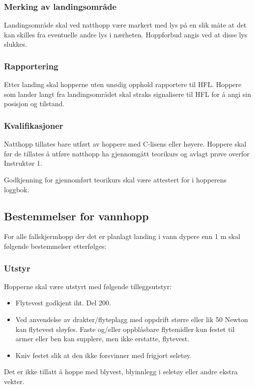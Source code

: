 \subsubsection{Merking av landingsområde}
Landingsområde skal ved natthopp være markert med lys på en slik måte at det kan skilles fra eventuelle andre lys i nærheten. Hoppforbud angis ved at disse lys slukkes.

\subsubsection{Rapportering}
Etter landing skal hopperne uten unødig opphold rapportere til HFL. Hoppere som lander langt fra landingsområdet skal straks signalisere til HFL for å angi sin posisjon og tilstand.

\subsubsection{Kvalifikasjoner}
Natthopp tillates bare utført av hoppere med C-lisens eller høyere. Hoppere skal før de tillates å utføre natthopp ha gjennomgått teorikurs og avlagt prøve overfor Instruktør 1.

Godkjenning for gjennomført teorikurs skal være attestert for i hopperens loggbok.

\subsection{Bestemmelser for vannhopp}
For alle fallskjermhopp der det er planlagt landing i vann dypere enn 1 m skal følgende bestemmelser etterfølges:

\subsubsection{Utstyr}
Hopperne skal være utstyrt med følgende tilleggsutstyr:
\begin{itemize}
	\item Flytevest godkjent iht. Del 200.
	\item Ved anvendelse av drakter/flyteplagg med oppdrift større eller lik 50 Newton kan flytevest sløyfes. Faste og/eller oppblåsbare flytemidler kun festet til armer eller ben kan supplere, men ikke erstatte, flytevest.
	\item Kniv festet slik at den ikke forsvinner med frigjort seletøy.
\end{itemize}

Det er ikke tillatt å hoppe med blyvest, blyinnlegg i seletøy eller andre ekstra vekter.

